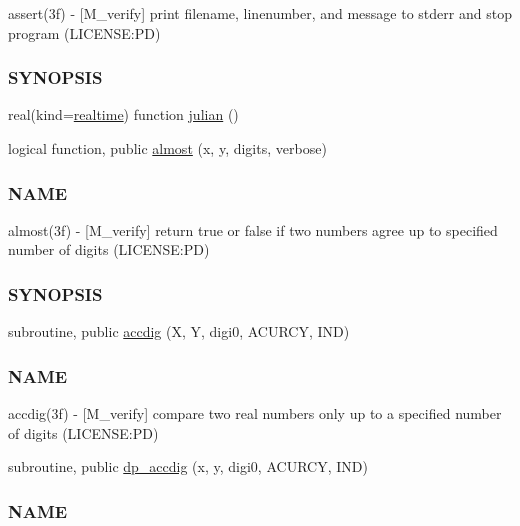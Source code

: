 \begin{DoxyCompactItemize}
\begin{DoxyCompactList}
assert(3f) -\/ \mbox{[}M\+\_\+verify\mbox{]} print filename, linenumber, and message to stderr and stop program (L\+I\+C\+E\+N\+SE\+:PD) \subsubsection*{S\+Y\+N\+O\+P\+S\+IS}\end{DoxyCompactList}\item 
real(kind=\mbox{\hyperlink{namespacem__verify_a7f6aa94b09b3824bc5c15bc74e757d6b}{realtime}}) function \mbox{\hyperlink{namespacem__verify_a1a97667eb1d53ce5b97a60c4a9ebe565}{julian}} ()
\item 
logical function, public \mbox{\hyperlink{namespacem__verify_ac5b0a0323929702a4b9e3fb918ea19b3}{almost}} (x, y, digits, verbose)
\begin{DoxyCompactList}\small\item\em \subsubsection*{N\+A\+ME}

almost(3f) -\/ \mbox{[}M\+\_\+verify\mbox{]} return true or false if two numbers agree up to specified number of digits (L\+I\+C\+E\+N\+SE\+:PD) \subsubsection*{S\+Y\+N\+O\+P\+S\+IS}\end{DoxyCompactList}\item 
subroutine, public \mbox{\hyperlink{namespacem__verify_a311d01ea90882e4db1e87520ba731d5c}{accdig}} (X, Y, digi0, A\+C\+U\+R\+CY, I\+ND)
\begin{DoxyCompactList}\small\item\em \subsubsection*{N\+A\+ME}

accdig(3f) -\/ \mbox{[}M\+\_\+verify\mbox{]} compare two real numbers only up to a specified number of digits (L\+I\+C\+E\+N\+SE\+:PD) \end{DoxyCompactList}\item 
subroutine, public \mbox{\hyperlink{namespacem__verify_a7408df33e6934a8959fdeda8cc3fb5ff}{dp\+\_\+accdig}} (x, y, digi0, A\+C\+U\+R\+CY, I\+ND)
\begin{DoxyCompactList}\small\item\em \subsubsection*{N\+A\+ME}


\end{DoxyCompactList}
\end{DoxyCompactItemize}
